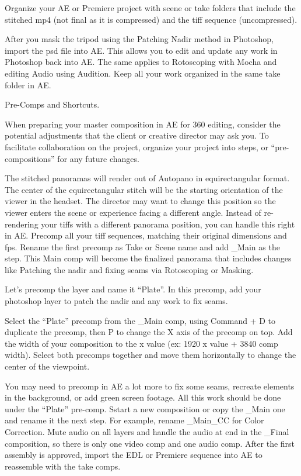 \begin{fullwidth}
\clearpage
Organize your AE or Premiere project with scene or take folders that include the stitched mp4 (not final as it is compressed) and the tiff sequence (uncompressed). 


After you mask the tripod using the Patching Nadir method in Photoshop, import the psd file into AE. This allows you to edit and update any work in Photoshop back into AE. The same applies to Rotoscoping with Mocha and editing Audio using Audition. Keep all your work organized in the same take folder in AE.

\clearpage
{\large Pre-Comps and Shortcuts. \par}

When preparing your master composition in AE for 360 editing, consider the potential adjustments that the client or creative director may ask you. To facilitate collaboration on the project, organize your project into steps, or “pre-compositions” for any future changes. 

The stitched panoramas will render out of Autopano in equirectangular format. The center of the equirectangular stitch will be the starting orientation of the viewer in the headset. The director may want to change this position so the viewer enters the scene or experience facing a different angle. Instead of re-rendering your tiffs with a different panorama position, you can handle this right in AE. Precomp all your tiff sequences, matching their original dimensions and fps. Rename the first precomp as Take or Scene name and add \_Main as the step. This Main comp will become the finalized panorama that includes changes like Patching the nadir and fixing seams via Rotoscoping or Masking. 

\clearpage
Let’s precomp the layer and name it “Plate”. In this precomp, add your photoshop layer to patch the nadir and any work to fix seams. 



Select the “Plate” precomp from the \_Main comp, using Command + D to duplicate the precomp, then P to change the X axis of the precomp on top. Add the width of your composition to the x value (ex: 1920 x value + 3840 comp width). Select both precomps together and move them horizontally to change the center of the viewpoint.
\clearpage
{}

You may need to precomp in AE a lot more to fix some seams, recreate elements in the background, or add green screen footage. All this work should be done under the “Plate” pre-comp. Sstart a new composition or copy the \_Main one and rename it the next step. For example, rename \_Main\_CC for Color Correction. Mute audio on all layers and handle the audio at end in the \_Final composition, so there is only one video comp and one audio comp. After the first assembly is approved, import the EDL or Premiere sequence into AE to reassemble with the take comps.


\end{fullwidth}
